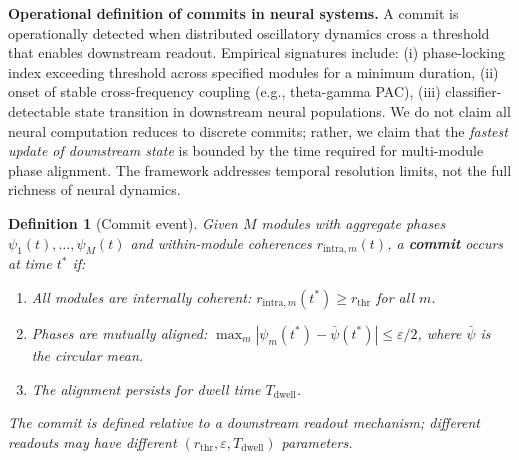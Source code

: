 \documentclass[12pt]{article}
\newtheorem{definition}{Definition}
\begin{document}
\textbf{Operational definition of commits in neural systems.} A commit is operationally detected when distributed oscillatory dynamics cross a threshold that enables downstream readout. Empirical signatures include: (i) phase-locking index exceeding threshold across specified modules for a minimum duration, (ii) onset of stable cross-frequency coupling (e.g., theta-gamma PAC), (iii) classifier-detectable state transition in downstream neural populations. We do not claim all neural computation reduces to discrete commits; rather, we claim that the \emph{fastest update of downstream state} is bounded by the time required for multi-module phase alignment. The framework addresses temporal resolution limits, not the full richness of neural dynamics.

\begin{definition}[Commit event]\label{def:commit}
Given $M$ modules with aggregate phases $\psi_1(t), \ldots, \psi_M(t)$ and within-module coherences $r_{\mathrm{intra},m}(t)$, a \textbf{commit} occurs at time $t^*$ if:
\begin{enumerate}
\item All modules are internally coherent: $r_{\mathrm{intra},m}(t^*) \geq r_{\mathrm{thr}}$ for all $m$.
\item Phases are mutually aligned: $\max_m |\psi_m(t^*) - \bar{\psi}(t^*)| \leq \varepsilon/2$, where $\bar{\psi}$ is the circular mean.
\item The alignment persists for dwell time $T_{\mathrm{dwell}}$.
\end{enumerate}
The commit is defined \emph{relative to a downstream readout mechanism}; different readouts may have different $(r_{\mathrm{thr}}, \varepsilon, T_{\mathrm{dwell}})$ parameters.
\end{definition}

\medskip
\noindent{}
\medskip
\end{document}
